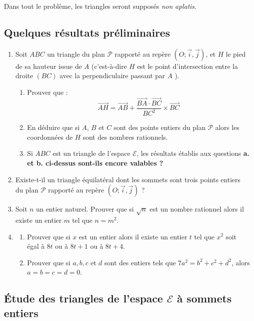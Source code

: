 \documentclass[landscape,twocolumn,leqno,a4paper,10pt]{report} %
\newcommand\n{\noindent}
\renewcommand{\textbf}[1]{\begingroup\bfseries\mathversion{bold}#1\endgroup}		%
\begin{document}
\n Dans tout le problème, les triangles seront supposés \textit{non aplatis}.

\subsection{Quelques résultats préliminaires}

\begin{enumerate}
	\item Soit $A B C$ un triangle du plan $\mathscr{P}$ rapporté au repère $\left (O ; \vec{i}, \vec{j}\right )$, et $H$ le pied de sa hauteur issue de $A$ (c'est-à-dire $H$ est le point d'intersection entre la droite $(B C)$ avec la perpendiculaire passant par $A$ ).
	\begin{enumerate}
		\item Prouver que :
		$$\overrightarrow{A H}=\overrightarrow{A B}+\frac{\overrightarrow{B A} \cdot \overrightarrow{B C}}{B C^{2}} \times \overrightarrow{B C}$$
		\item En déduire que si $A$, $B$ et $C$ sont des points entiers du plan $\mathscr{P}$ alors les coordonnées de $H$ sont des nombres rationnels.
		\item Si $A B C$ est un triangle de l'espace $\mathscr{E}$, les résultats établis aux questions \textbf{a.} et \textbf{b.} ci-dessus sont-ils encore valables ?
	\end{enumerate}
	\item Existe-t-il un triangle équilatéral dont les sommets sont trois points entiers du plan $\mathscr{P}$ rapporté au repère $\left (O ; \vec{i}, \vec{j}\right )$ ?
	\item Soit $n$ un entier naturel. Prouver que si $\sqrt{n}$ est un nombre rationnel alors il existe un entier $m$ tel que $n=m^{2}$.
	\item \begin{enumerate}
		\item Prouver que si $x$ est un entier alors il existe un entier $t$ tel que $x^{2}$ soit égal à $8 t$ ou à $8 t+1$ ou à $8 t+4$.
		\item Prouver que si $a, b, c$ et $d$ sont des entiers tels que $7 a^{2}=b^{2}+c^{2}+d^{2}$, alors $a=b=c=d=0$.
	\end{enumerate}
\end{enumerate}


\subsection{Étude des triangles de l'espace $\mathscr{E}$ à sommets entiers}
\end{document}
